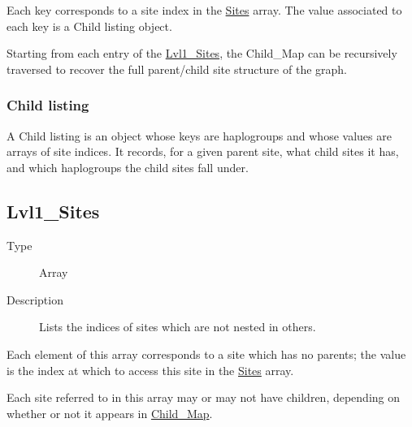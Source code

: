 Each key corresponds to a site index in the
\protect\hyperlink{sites}{Sites} array. The value associated to each key
is a Child listing object.

Starting from each entry of the
\protect\hyperlink{lvl1_sites}{Lvl1\_Sites}, the Child\_Map can be
recursively traversed to recover the full parent/child site structure of
the graph.

\hypertarget{child-listing}{%
\subsubsection{Child listing}\label{child-listing}}

A Child listing is an object whose keys are haplogroups and whose values
are arrays of site indices. It records, for a given parent site, what
child sites it has, and which haplogroups the child sites fall under.

\hypertarget{lvl1_sites}{%
\subsection{Lvl1\_Sites}\label{lvl1_sites}}

\begin{description}
\item[Type]
Array
\item[Description]
Lists the indices of sites which are not nested in others.
\end{description}

Each element of this array corresponds to a site which has no parents;
the value is the index at which to access this site in the
\protect\hyperlink{sites}{Sites} array.

Each site referred to in this array may or may not have children,
depending on whether or not it appears in
\protect\hyperlink{child_map}{Child\_Map}.
